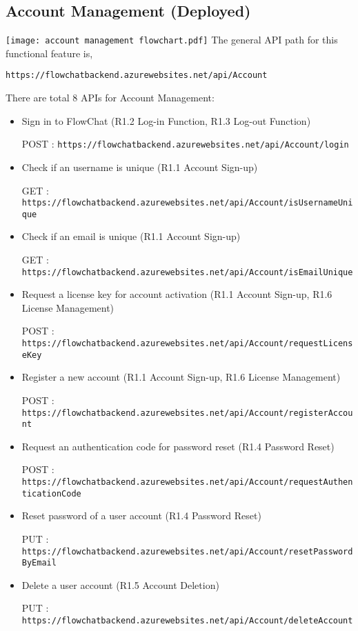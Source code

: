 \documentclass[11pt, a4paper]{article}
\begin{document}
\subsection{Account Management (Deployed)}
\texttt{[image: account management flowchart.pdf]}
The general API path for this functional feature is,

\begin{center}
    \texttt{https://flowchatbackend.azurewebsites.net/api/Account}
\end{center}

There are total 8 APIs for Account Management:

\begin{itemize}
\item Sign in to FlowChat (R1.2 Log-in Function, R1.3 Log-out Function)

POST :  \texttt{https://flowchatbackend.azurewebsites.net/api/Account/login}

\item Check if an username is unique (R1.1 Account Sign-up)

GET :  \texttt{https://flowchatbackend.azurewebsites.net/api/Account/isUsernameUnique}

\item Check if an email is unique (R1.1 Account Sign-up)

GET :  \texttt{https://flowchatbackend.azurewebsites.net/api/Account/isEmailUnique}

\item Request a license key for account activation (R1.1 Account Sign-up, R1.6 License Management)

POST :  \texttt{https://flowchatbackend.azurewebsites.net/api/Account/requestLicenseKey}

\item Register a new account (R1.1 Account Sign-up, R1.6 License Management)

POST :  \texttt{https://flowchatbackend.azurewebsites.net/api/Account/registerAccount}

\item Request an authentication code for password reset (R1.4 Password Reset)

POST :  \texttt{https://flowchatbackend.azurewebsites.net/api/Account/requestAuthenticationCode}

\item Reset password of a user account (R1.4 Password Reset)

PUT :  \texttt{https://flowchatbackend.azurewebsites.net/api/Account/resetPasswordByEmail}

\item  Delete a user account (R1.5 Account Deletion)

PUT :  \texttt{https://flowchatbackend.azurewebsites.net/api/Account/deleteAccount}

\end{itemize}
\end{document}
